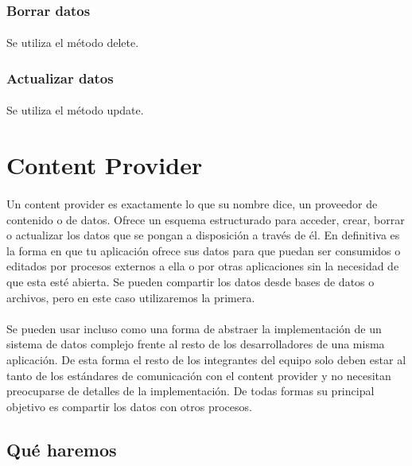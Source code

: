 \documentclass[10pt]{extarticle}
\begin{document}
\subsubsection{Borrar datos}
\paragraph{}
Se utiliza el método delete.

\subsubsection{Actualizar datos}
\paragraph{}
Se utiliza el método update.


\section{Content Provider}

\paragraph{}
Un content provider es exactamente lo que su nombre dice, un proveedor de contenido o de datos. Ofrece un esquema estructurado para acceder, crear, borrar o actualizar los datos que se pongan a disposición a través de él. En definitiva es la forma en que tu aplicación ofrece sus datos para que puedan ser consumidos o editados por procesos externos a ella o por otras aplicaciones sin la necesidad de que esta esté abierta. Se pueden compartir los datos desde bases de datos o archivos, pero en este caso utilizaremos la primera.

\paragraph{}
Se pueden usar incluso como una forma de abstraer la implementación de un sistema de datos complejo frente al resto de los desarrolladores de una misma aplicación. De esta forma el resto de los integrantes del equipo solo deben estar al tanto de los estándares de comunicación con el content provider y no necesitan preocuparse de detalles de la implementación. De todas formas su principal objetivo es compartir los datos con otros procesos.

\subsection{Qué haremos}
\end{document}
